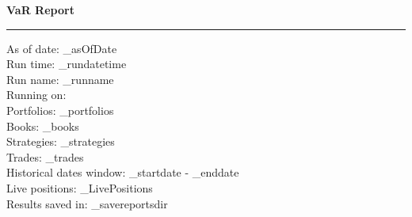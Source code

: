 \documentclass[letterpaper,10pt,landscape]{article}
\begin{document}
\begin{flushright}
{\color{blue}\LARGE\bf{VaR Report}}
\end{flushright}
\rule{\textwidth}{1pt}

\noindent
As of date: _asOfDate \\
Run time: _rundatetime \\
Run name: _runname \\
Running on:\\
\hspace*{\parindent}Portfolios: _portfolios \\
\hspace*{\parindent}Books: _books \\
\hspace*{\parindent}Strategies: _strategies \\
\hspace*{\parindent}Trades: _trades \\
Historical dates window: _startdate - _enddate \\
Live positions: _LivePositions \\
Results saved in: _savereportsdir \\

\begin{center}\end{center}

\end{document}
